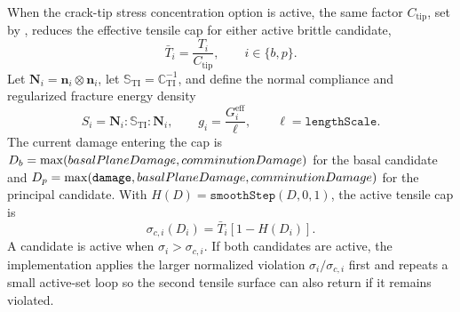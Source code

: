 When the crack-tip stress concentration option is active, the same factor $C_{\mathrm{tip}}$, set by , reduces the effective tensile cap for either active brittle candidate,
\begin{equation}
  \bar T_i = \frac{T_i}{C_{\mathrm{tip}}},
  \qquad i\in\{b,p\}.
  \label{eq:graphite-brittle-effective-strength}
\end{equation}
Let \(\mathbf N_i=\mathbf n_i\otimes\mathbf n_i\), let \(\mathbb S_{\mathrm{TI}}=\mathbb C_{\mathrm{TI}}^{-1}\), and define the normal compliance and regularized fracture energy density
\begin{equation}
  S_i = \mathbf N_i:\mathbb S_{\mathrm{TI}}:\mathbf N_i,
  \qquad
  g_i=\frac{G_i^{\mathrm{eff}}}{\ell},
  \qquad
  \ell=\texttt{lengthScale}.
  \label{eq:graphite-brittle-compliance}
\end{equation}
The current damage entering the cap is \(D_b=\max(basalPlaneDamage,comminutionDamage)\) for the basal candidate and \(D_p=\max(\texttt{damage},basalPlaneDamage,comminutionDamage)\) for the principal candidate.  With \(H(D)=\texttt{smoothStep}(D,0,1)\), the active tensile cap is
\begin{equation}
  \sigma_{c,i}(D_i)=\bar T_i\left[1-H(D_i)\right].
  \label{eq:graphite-brittle-cap}
\end{equation}
A candidate is active when \(\sigma_i>\sigma_{c,i}\).  If both candidates are active, the implementation applies the larger normalized violation \(\sigma_i/\sigma_{c,i}\) first and repeats a small active-set loop so the second tensile surface can also return if it remains violated.

